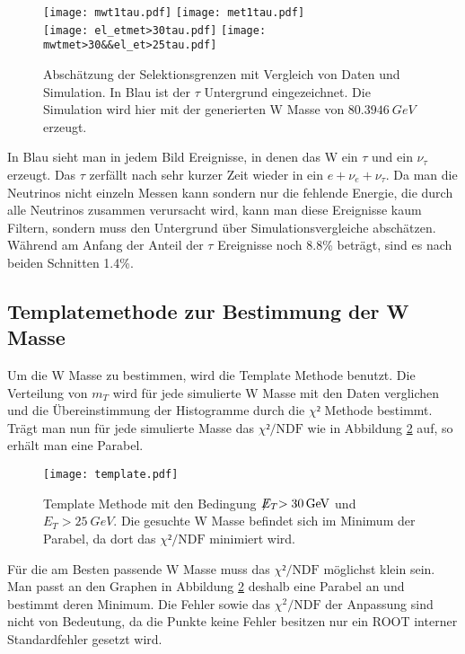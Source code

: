 \documentclass[a4paper,12pt]{article}
\newcommand{\met}{\ensuremath{\not\mathrel{E}}_T}
\begin{document}
\begin{figure}[h]
	\centering
	\texttt{[image: mwt1tau.pdf]}
	\texttt{[image: met1tau.pdf]}\\
	\texttt{[image: el\_etmet>30tau.pdf]}
	\texttt{[image: mwtmet>30\&\&el\_et>25tau.pdf]}
	\caption{Abschätzung der Selektionsgrenzen mit Vergleich von Daten und Simulation. In Blau ist
	der $τ$ Untergrund eingezeichnet. Die Simulation wird hier mit der generierten W Masse von
	$\SI{80.3946}{GeV}$ erzeugt.}
	\label{fig:abschaetzung}
\end{figure}

In Blau sieht man in jedem Bild Ereignisse, in denen das W ein $τ$ und ein $ν_τ$ erzeugt. Das $τ$
zerfällt nach sehr kurzer Zeit wieder in ein $e + ν_e + ν_τ$. Da man die Neutrinos nicht einzeln
Messen kann sondern nur die fehlende Energie, die durch alle Neutrinos zusammen verursacht wird,
kann man diese Ereignisse kaum Filtern, sondern muss den Untergrund über Simulationsvergleiche
abschätzen. Während am Anfang der Anteil der $τ$ Ereignisse noch 8.8\% beträgt, sind es nach beiden
Schnitten 1.4\%.

\subsection{Templatemethode zur Bestimmung der W Masse}
Um die W Masse zu bestimmen, wird die Template Methode benutzt.
Die Verteilung von $m_T$ wird für jede simulierte W Masse mit den Daten verglichen und die
Übereinstimmung der Histogramme durch die $χ²$ Methode bestimmt. Trägt man nun für jede simulierte
Masse das $χ²/\text{NDF}$ wie in Abbildung \ref{fig:template} auf, so erhält man eine Parabel.

\begin{figure}[htb]
	\centering
	\texttt{[image: template.pdf]}
	\caption{Template Methode mit den Bedingung $\met > \SI{30}{GeV}$ und $E_{T} > \SI{25}{GeV}$. Die gesuchte W Masse befindet sich im Minimum der Parabel, da dort
		das $χ²/\text{NDF}$ minimiert wird.}
	\label{fig:template}
\end{figure}

Für die am Besten passende W Masse muss das $χ²/\text{NDF}$ möglichst klein sein. Man passt an den
Graphen in Abbildung \ref{fig:template} deshalb eine Parabel an und bestimmt deren Minimum. Die
Fehler sowie das $χ^2/\text{NDF}$ der Anpassung sind nicht von Bedeutung, da die Punkte keine
Fehler besitzen nur ein ROOT interner Standardfehler gesetzt wird.
\end{document}
